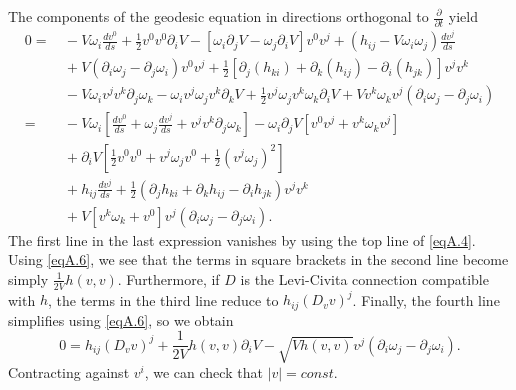 \documentclass[12pt]{amsart}
\numberwithin{equation}{section}
\begin{document}
The components of the geodesic equation in directions orthogonal to $\frac{\partial}{\partial t}$ yield
\begin{equation}
\label{eqA.7}
\begin{split}
0=&\, -V\omega_i \frac{dv^0}{ds} +\frac12 v^0v^0\partial_i V - \left [ \omega_i\partial_j V -\omega_j \partial_i V\right ]v^0v^j +\left ( h_{ij} -V\omega_i\omega_j \right ) \frac{dv^j}{ds} \\
&\, +V\left ( \partial_i \omega_j -\partial_j \omega_i\right ) v^0v^j +\frac12 \left [ \partial_j \left ( h_{ki} \right ) +\partial_k \left ( h_{ij} \right ) -\partial_i \left ( h_{jk} \right )\right ]v^jv^k\\
&\, -V\omega_iv^jv^k\partial_j\omega_k - \omega_iv^j\omega_j v^k\partial_k V +\frac12 v^j\omega_jv^k\omega_k \partial_i V +Vv^k\omega_k v^j \left ( \partial_i \omega_j - \partial_j\omega_i\right )\\
=&\, -V\omega_i \left [ \frac{dv^0}{ds} +\omega_j \frac{dv^j}{ds} +v^jv^k\partial_j\omega_k \right ] -\omega_i\partial_j V \left [ v^0v^j +v^k\omega_k v^j\right ]\\
&\, +\partial_i V \left [ \frac12 v^0v^0 +v^j\omega_j v^0 +\frac12 \left (v^j\omega_j\right )^2 \right ] \\
&\, + h_{ij}  \frac{dv^j}{ds} +\frac12 \left ( \partial_j h_{ki} +\partial_k h_{ij} -\partial_i h_{jk} \right )v^jv^k \\
&\, +V\left [ v^k\omega_k+v^0\right ] v^j \left ( \partial_i \omega_j- \partial_j\omega_i\right ) .
\end{split}
\end{equation}
The first line in the last expression vanishes by using the top line of \eqref{eqA.4}. Using \eqref{eqA.6}, we see that the terms in square brackets in the second line become simply $\frac{1}{2V}h(v,v)$. Furthermore, if $D$ is the Levi-Civita connection compatible with $h$, the terms in the third line reduce to $h_{ij} \left ( D_v v\right )^j$. Finally, the fourth line simplifies using \eqref{eqA.6}, so we obtain
\begin{equation}
\label{eqA.8}
0= h_{ij} \left ( D_v v\right )^j +\frac{1}{2V} h(v,v) \partial_i V -\sqrt{Vh(v,v)} v^j \left ( \partial_i \omega_j- \partial_j\omega_i\right ) .
\end{equation}
Contracting against $v^i$, we can check that $|v|=const$.
\end{document}
